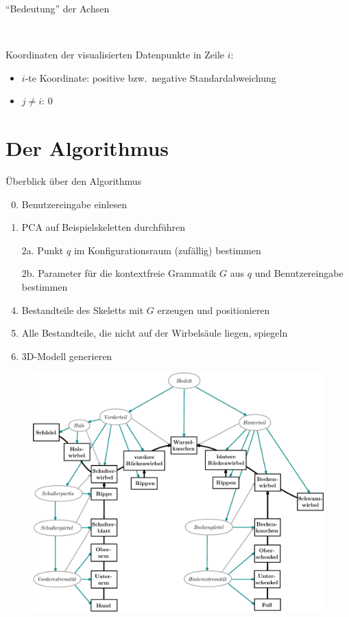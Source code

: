 \documentclass{beamer}
\newcommand{\bzw}{bzw.\ }
\begin{document}
\begin{frame}{"`Bedeutung"' der Achsen}
\begin{minipage}{0.6\textwidth}
\begin{figure}
  \end{figure}
 \end{minipage}~
 \begin{minipage}{0.4\textwidth}
  Koordinaten der visualisierten Datenpunkte in Zeile $i$:
  \begin{itemize}
   \item $i$-te Koordinate: positive \bzw negative Standardabweichung
   \item $j \neq i$: $0$
  \end{itemize}
 \end{minipage}
\end{frame}

\section{Der Algorithmus}
\begin{frame}{Überblick über den Algorithmus}
 \begin{enumerate}
  \setcounter{enumi}{-1}
  \item Benutzereingabe einlesen
  \item PCA auf Beispielskeletten durchführen
  \item[2a.] Punkt $q$ im Konfigurationsraum (zufällig) bestimmen 
  \item[2b.] Parameter für die kontextfreie Grammatik $G$ aus $q$ und Benutzereingabe bestimmen
  \setcounter{enumi}{2}
  \item Bestandteile des Skeletts mit $G$ erzeugen und positionieren
  \item Alle Bestandteile, die nicht auf der Wirbelsäule liegen, spiegeln
  \item 3D-Modell generieren
 \end{enumerate}
\end{frame}

\begin{frame}
  \begin{figure}
   \includegraphics[height=0.9\textheight]{../graphics/grammarGraph_withoutLegend}
  \end{figure}
\end{frame}
\end{document}
